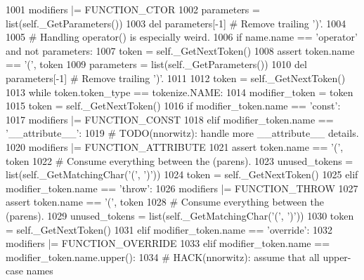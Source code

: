 \begin{DoxyCode}
1001             modifiers |= FUNCTION\_CTOR
1002         parameters = list(self.\_GetParameters())
1003         del parameters[-1]              \textcolor{comment}{# Remove trailing ')'.}
1004 
1005         \textcolor{comment}{# Handling operator() is especially weird.}
1006         \textcolor{keywordflow}{if} name.name == \textcolor{stringliteral}{'operator'} \textcolor{keywordflow}{and} \textcolor{keywordflow}{not} parameters:
1007             token = self.\_GetNextToken()
1008             \textcolor{keyword}{assert} token.name == \textcolor{stringliteral}{'('}, token
1009             parameters = list(self.\_GetParameters())
1010             del parameters[-1]          \textcolor{comment}{# Remove trailing ')'.}
1011 
1012         token = self.\_GetNextToken()
1013         \textcolor{keywordflow}{while} token.token\_type == tokenize.NAME:
1014             modifier\_token = token
1015             token = self.\_GetNextToken()
1016             \textcolor{keywordflow}{if} modifier\_token.name == \textcolor{stringliteral}{'const'}:
1017                 modifiers |= FUNCTION\_CONST
1018             \textcolor{keywordflow}{elif} modifier\_token.name == \textcolor{stringliteral}{'\_\_attribute\_\_'}:
1019                 \textcolor{comment}{# TODO(nnorwitz): handle more \_\_attribute\_\_ details.}
1020                 modifiers |= FUNCTION\_ATTRIBUTE
1021                 \textcolor{keyword}{assert} token.name == \textcolor{stringliteral}{'('}, token
1022                 \textcolor{comment}{# Consume everything between the (parens).}
1023                 unused\_tokens = list(self.\_GetMatchingChar(\textcolor{stringliteral}{'('}, \textcolor{stringliteral}{')'}))
1024                 token = self.\_GetNextToken()
1025             \textcolor{keywordflow}{elif} modifier\_token.name == \textcolor{stringliteral}{'throw'}:
1026                 modifiers |= FUNCTION\_THROW
1027                 \textcolor{keyword}{assert} token.name == \textcolor{stringliteral}{'('}, token
1028                 \textcolor{comment}{# Consume everything between the (parens).}
1029                 unused\_tokens = list(self.\_GetMatchingChar(\textcolor{stringliteral}{'('}, \textcolor{stringliteral}{')'}))
1030                 token = self.\_GetNextToken()
1031             \textcolor{keywordflow}{elif} modifier\_token.name == \textcolor{stringliteral}{'override'}:
1032                 modifiers |= FUNCTION\_OVERRIDE
1033             \textcolor{keywordflow}{elif} modifier\_token.name == modifier\_token.name.upper():
1034                 \textcolor{comment}{# HACK(nnorwitz):  assume that all upper-case names}

\end{DoxyCode}
